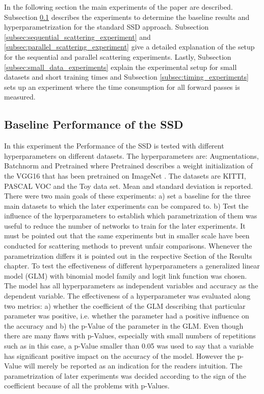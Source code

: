 In the following section the main experiments of the paper are described. Subsection \ref{subsec:baseline_SSD} describes the experiments to determine the baseline results and hyperparametrization for the standard SSD approach. Subsection \ref{subsec:sequential_scattering_experiment} and \ref{subsec:parallel_scattering_experiment} give a detailed explanation of the setup for the sequential and parallel scattering experiments. Lastly, Subsection \ref{subsec:small_data_experiments} explain the experimental setup for small datasets and short training times and Subsection \ref{subsec:timing_experiments} sets up an experiment where the time consumption for all forward passes is measured. 

\subsection{Baseline Performance of the SSD}
\label{subsec:baseline_SSD}

In this experiment the Performance of the SSD is tested with different hyperparameters on different datasets. The hyperparameters are: Augmentations, Batchnorm and Pretrained where Pretrained describes a weight initialization of the VGG16 that has been pretrained on ImageNet \cite{imagenet_cvpr09}. The datasets are KITTI, PASCAL VOC and the Toy data set. Mean and standard deviation is reported. There were two main goals of these experiments: a) set a baseline for the three main datasets to which the later experiments can be compared to.  b) Test the influence of the hyperparameters to establish which parametrization of them was useful to reduce the number of networks to train for the later experiments. It must be pointed out that the same experiments but in smaller scale have been conducted for scattering methods to prevent unfair comparisons. Whenever the parametrization differs it is pointed out in the respective Section of the Results chapter. 
To test the effectiveness of different hyperparameters a generalized linear model (GLM) with binomial model family and logit link function was chosen. The model has all hyperparameters as independent variables and accuracy as the dependent variable. The effectiveness of a hyperparameter was evaluated along two metrics: a) whether the coefficient of the GLM describing that particular parameter was positive, i.e. whether the parameter had a positive influence on the accuracy and b) the p-Value of the parameter in the GLM. Even though there are many flaws with p-Values, especially with small numbers of repetitions such as in this case, a p-Value smaller than 0.05 was used to say that a variable has significant positive impact on the accuracy of the model. However the p-Value will merely be reported as an indication for the readers intuition. The parametrization of later experiments was decided according to the sign of the coefficient because of all the problems with p-Values.

